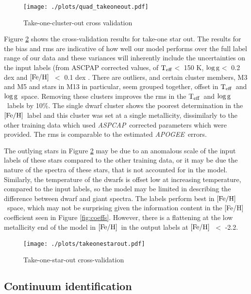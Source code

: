 \documentclass[12pt, preprint]{aastex}
\newcommand{\teff}{\mbox{$\rm T_{eff}$}}
\newcommand{\feh}{\mbox{$\rm [Fe/H]$}}
\newcommand{\logg}{\mbox{$\rm \log g$}}
\newcommand{\apogee}{\textsl{APOGEE}}
\newcommand{\aspcap}{\textsl{ASPCAP}}
\begin{document}
\begin{figure}[h!]
\centering
  \texttt{[image: ./plots/quad\_takeoneout.pdf]}
\caption{Take-one-cluster-out cross validation}
\label{fig:takeoneout}
\end{figure}

Figure \ref{fig:takeonestarout} shows the cross-validation results for take-one star out. The results for the bias and rms are indicative of how well our model performs over the full label range of our data and these variances will inherently include the uncertainties on the input labels (from ASCPAP corrected values, of \teff $<$ 150 K, \logg $<$ 0.2 dex and \feh\ $<$ 0.1 dex \citep{Meszaros2013}. There are outliers, and certain cluster members, M3 and M5 and stars in M13 in particular, seem grouped together, offset in \teff\ and \logg\ space. Removing these clusters improves the rms in the \teff\ and \logg\ labels by 10\%. The single dwarf cluster shows the poorest determination in the \feh\ label and this cluster was set at a single metallicity, dissimilarly to the other training data which used \aspcap\ corrected parameters which were provided. The rms is comparable to the estimated \apogee\ errors.

The outlying stars in Figure \ref{fig:takeonestarout} may be due to an anomalous scale of the input labels of these stars compared to the other training data, or it may be due the nature of the spectra of these stars, that is not accounted for in the model. Similarly, the temperature of the dwarfs is offset low at increasing temperature, compared to the input labels, so the model may be limited in describing the difference between dwarf and giant spectra. The labels perform best in \feh\ space, which may not be surprising given the information content in the [Fe/H] coefficient seen in Figure \ref{fig:coeffs}. However, there is a flattening at the low metallicity end of the model in \feh\ in the output labels at \feh\ $<$ -2.2. 



\begin{figure}[h!]
\centering
  \texttt{[image: ./plots/takeonestarout.pdf]}
\caption{Take-one-star-out cross-validation}
\label{fig:takeonestarout}
\end{figure}


\subsection{Continuum identification}
\end{document}
